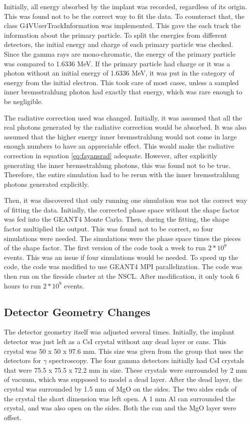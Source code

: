 \documentclass[../MaxHughesThesis.tex]{subfiles}
\begin{document}
Initially, all energy absorbed by the implant was recorded, regardless of its origin.
This was found not to be the correct way to fit the data.
To counteract that, the class G4VUserTrackInformation was implemented.
This gave the each track the information about the primary particle.
To split the energies from different detectors, the initial energy and charge of each primary particle was checked.
Since the gamma rays are mono-chromatic, the energy of the primary particle was compared to 1.6336 MeV.
If the primary particle had charge or it was a photon without an initial energy of 1.6336 MeV, it was put in the category of energy from the initial electron. 
This took care of most cases, unless a sampled inner bremsstrahlung photon had exactly that energy, which was rare enough to be negligible.

The radiative correction used was changed.
Initially, it was assumed that all the real photons generated by the radiative correction would be absorbed.
It was also assumed that the higher energy inner bremsstrahlung would not come in large enough numbers to have an appreciable effect. 
This would make the radiative correction in equation \ref{eq:fayansrad} adequate. 
However, after explicitly generating the inner bremsstrahlung photons, this was found not to be true.
Therefore, the entire simulation had to be rerun with the inner bremsstrahlung photons generated explicitly.

Then, it was discovered that only running one simulation was not the correct way of fitting the data.
Initially, the corrected phase space without the shape factor was fed into the GEANT4 Monte Carlo.
Then, during the fitting, the shape factor multiplied the output. 
This was found not to be correct, so four simulations were needed.
The simulations were the phase space times the pieces of the shape factor.
The first version of the code took a week to run $2 * 10^{9}$ events.
This was an issue if four simulations would be needed.
To speed up the code, the code was modified to use GEANT4 MPI parallelization.
The code was then run on the fireside cluster at the NSCL.
After modification, it only took 6 hours to run $2 * 10^{9}$ events.

\subsection{Detector Geometry Changes}
The detector geometry itself was adjusted several times.
Initially, the implant detector was just left as a CsI crystal without any dead layer or cans.
This crystal was 50 x 50 x 97.6 mm.
This size was given from the group that uses the detectors for $\gamma$ spectroscopy.
The four gamma detectors initially had CsI crystals that were 75.5 x 75.5 x 72.2 mm in size.
These crystals were surrounded by 2 mm of vacuum, which was supposed to model a dead layer.
After the dead layer, the crystal was surrounded by 1.5 mm of MgO on the sides.
The two sides ends of the crystal the short dimension was left open.
A 1 mm Al can surrounded the crystal, and was also open on the sides.
Both the can and the MgO layer were offset.
\end{document}
